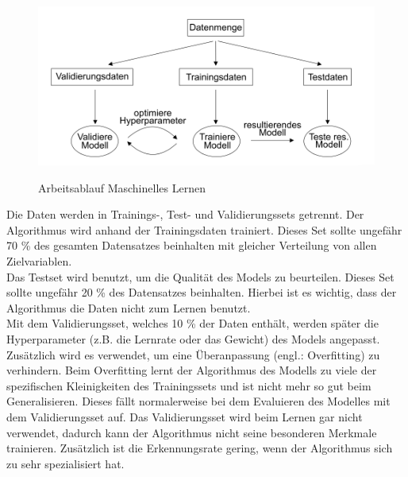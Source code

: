 \begin{figure}[h]
\centering
\includegraphics[scale=0.8]{pic/ML-Arbeitsablauf}
\caption[ML-Arbeitsablauf]{Arbeitsablauf Maschinelles Lernen}\cite{Choo_2020}
\end{figure}

Die Daten werden in Trainings-, Test- und Validierungssets getrennt.  Der Algorithmus wird anhand der Trainingsdaten trainiert. Dieses Set sollte ungefähr 70 \% des gesamten Datensatzes beinhalten mit gleicher Verteilung von allen Zielvariablen.  \cite{Geron2019}\\
Das Testset wird benutzt, um die Qualität des Models zu beurteilen. Dieses Set sollte ungefähr 20 \% des Datensatzes beinhalten. Hierbei ist es wichtig,  dass der Algorithmus die Daten nicht zum Lernen benutzt. \\
Mit dem Validierungsset, welches 10 \% der Daten enthält,  werden später die Hyperparameter (z.B.  die Lernrate oder das Gewicht) des Models angepasst.  Zusätzlich wird es verwendet,  um eine Überanpassung (engl.:  Overfitting) zu verhindern. Beim Overfitting lernt der Algorithmus des Modells zu viele der spezifischen Kleinigkeiten des Trainingssets und ist nicht mehr so gut beim Generalisieren. Dieses fällt normalerweise bei dem Evaluieren des Modelles mit dem Validierungsset auf. Das Validierungsset wird beim Lernen gar nicht verwendet, dadurch kann der Algorithmus nicht seine besonderen Merkmale trainieren. Zusätzlich ist die Erkennungsrate gering, wenn der Algorithmus sich zu sehr spezialisiert hat.


